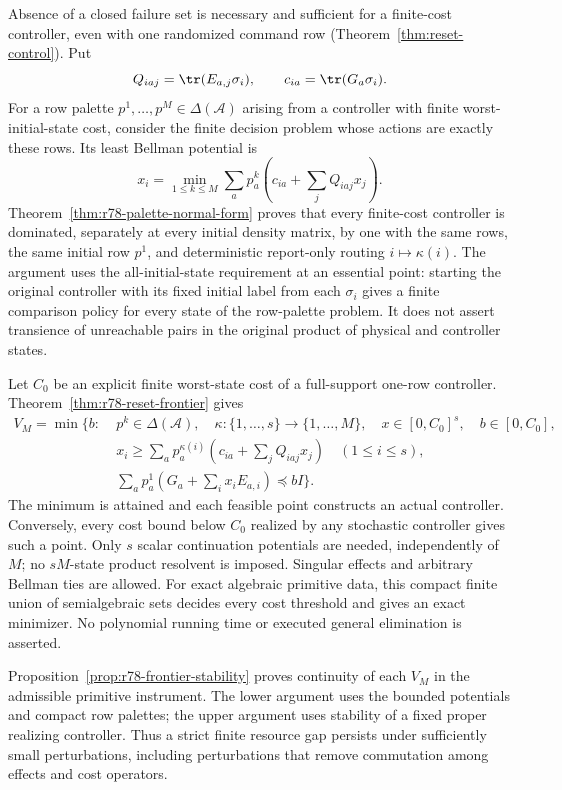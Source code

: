 Absence of a closed failure set is necessary and sufficient for a
finite-cost controller, even with one randomized command row
(Theorem~\ref{thm:reset-control}).  Put
\[
 Q_{iaj}=\tr(E_{a,j}\sigma_i),\qquad c_{ia}=\tr(G_a\sigma_i).
\]
For a row palette $p^1,\ldots,p^M\in\Delta(\mathcal A)$ arising from
a controller with finite worst-initial-state cost, consider the finite
decision problem whose actions are exactly these rows.  Its
least Bellman potential is
\[
 x_i=\min_{1\le k\le M}
           \sum_a p_a^k\left(c_{ia}+\sum_jQ_{iaj}x_j\right).
\]
Theorem~\ref{thm:r78-palette-normal-form} proves that every finite-cost
controller is dominated, separately at every initial density matrix,
by one with the same rows, the same initial row $p^1$, and deterministic
report-only routing $i\mapsto\kappa(i)$.  The argument uses the
all-initial-state requirement at an essential point: starting the
original controller with its fixed initial label from each $\sigma_i$
gives a finite comparison policy for every state of the row-palette
problem.  It does not assert transience of unreachable pairs in the
original product of physical and controller states.

Let $C_0$ be an explicit finite worst-state cost of a full-support
one-row controller.  Theorem~\ref{thm:r78-reset-frontier} gives
\begin{equation}\label{eq:r78-intro-frontier}
\begin{split}
 V_M=\min\{b:\;&p^k\in\Delta(\mathcal A),\quad
      \kappa:\{1,\ldots,s\}\to\{1,\ldots,M\},\quad
      x\in[0,C_0]^s,\quad b\in[0,C_0],\\
 &x_i\ge\sum_a p_a^{\kappa(i)}
                  (c_{ia}+\sum_jQ_{iaj}x_j)\quad(1\le i\le s),\\
 &\sum_a p_a^1(G_a+\sum_i x_iE_{a,i})\preccurlyeq bI\}.
\end{split}
\end{equation}
The minimum is attained and each feasible point constructs an actual
controller.  Conversely, every cost bound below $C_0$ realized by any
stochastic controller gives such a point.  Only $s$ scalar continuation
potentials are needed, independently of $M$; no $sM$-state product
resolvent is imposed.  Singular effects and arbitrary Bellman ties are
allowed.  For exact algebraic primitive data, this compact finite union
of semialgebraic sets decides every cost threshold and gives an exact
minimizer.  No polynomial running time or executed general elimination
is asserted.

Proposition~\ref{prop:r78-frontier-stability} proves continuity of each
$V_M$ in the admissible primitive instrument.  The lower argument uses
the bounded potentials and compact row palettes; the upper argument
uses stability of a fixed proper realizing controller.  Thus a strict
finite resource gap persists under sufficiently small perturbations,
including perturbations that remove commutation among effects and
cost operators.

